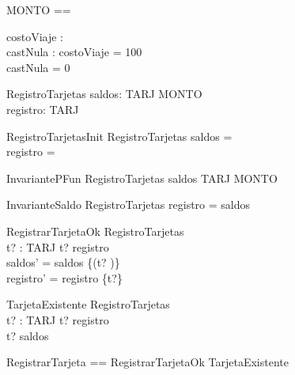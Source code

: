 \begin{zed}
[TARJ]
\end{zed}

\begin{zed}
MONTO == \nat 
\end{zed}

\begin{axdef}
costoViaje : \nat \\
castNula : \nat
\where
costoViaje = 100 \\
castNula = 0
\end{axdef}

\begin{schema}{RegistroTarjetas}
    saldos: TARJ \rel MONTO \\
    registro: \power TARJ
\end{schema}

\begin{schema}{RegistroTarjetasInit}
    RegistroTarjetas
\where
    saldos = \emptyset \\
    registro = \emptyset
\end{schema}

\begin{schema}{InvariantePFun}
    RegistroTarjetas
\where
    saldos \in TARJ \pfun MONTO
\end{schema}

\begin{schema}{InvarianteSaldo}
    RegistroTarjetas
\where
    registro = \dom saldos
\end{schema}

\begin{schema}{RegistrarTarjetaOk}
    \Delta RegistroTarjetas \\
    t? : TARJ 
\where
    t? \notin registro \\ 
    saldos' = saldos \cup \{(t? )\} \\
    registro' = registro \cup \{t?\} 
\end{schema}

\begin{schema}{TarjetaExistente}
    \Xi RegistroTarjetas \\
    t? : TARJ 
\where
    t? \in registro \\
    t? \in \dom saldos 
\end{schema}

\begin{zed}
    RegistrarTarjeta == RegistrarTarjetaOk \lor TarjetaExistente \\
\end{zed}

